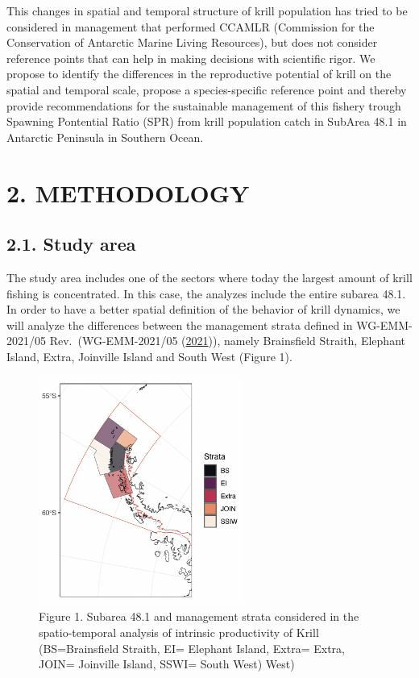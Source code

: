 \documentclass[
]{article}
\begin{document}
This changes in spatial and temporal structure of krill population has
tried to be considered in management that performed CCAMLR (Commission
for the Conservation of Antarctic Marine Living Resources), but does not
consider reference points that can help in making decisions with
scientific rigor. We propose to identify the differences in the
reproductive potential of krill on the spatial and temporal scale,
propose a species-specific reference point and thereby provide
recommendations for the sustainable management of this fishery trough
Spawning Pontential Ratio (SPR) from krill population catch in SubArea
48.1 in Antarctic Peninsula in Southern Ocean.

\newpage

\hypertarget{methodology}{%
\section{2. METHODOLOGY}\label{methodology}}

\hypertarget{study-area}{%
\subsection{2.1. Study area}\label{study-area}}

The study area includes one of the sectors where today the largest
amount of krill fishing is concentrated. In this case, the analyzes
include the entire subarea 48.1. In order to have a better spatial
definition of the behavior of krill dynamics, we will analyze the
differences between the management strata defined in WG-EMM-2021/05
Rev.~(WG-EMM-2021/05 (\protect\hyperlink{ref-Dornam2021}{2021})), namely
Brainsfield Straith, Elephant Island, Extra, Joinville Island and South
West (Figure 1).

\begin{figure}
\centering
\includegraphics[width=0.6\textwidth,height=\textheight]{Strata2.png}
\caption{Figure 1. Subarea 48.1 and management strata considered in the
spatio-temporal analysis of intrinsic productivity of Krill
(BS=Brainsfield Straith, EI= Elephant Island, Extra= Extra, JOIN=
Joinville Island, SSWI= South West) West)}
\end{figure}
\end{document}
